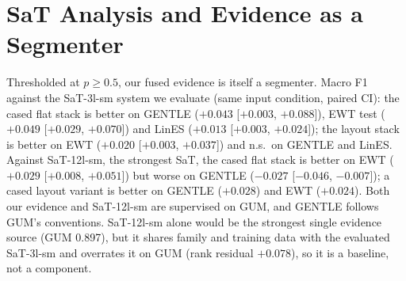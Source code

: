 
\section{SaT Analysis and Evidence as a Segmenter}
\label{app:sat}
Thresholded at $p \ge 0.5$, our fused evidence is itself a segmenter. Macro F1 against the SaT-3l-sm system we evaluate
(same input condition, paired CI): the cased flat stack is better on GENTLE ($+0.043$ [$+0.003$, $+0.088$]), EWT test
($+0.049$ [$+0.029$, $+0.070$]) and LinES ($+0.013$ [$+0.003$, $+0.024$]); the layout stack is better on EWT ($+0.020$
[$+0.003$, $+0.037$]) and n.s.\ on GENTLE and LinES. Against SaT-12l-sm, the strongest SaT, the cased flat stack is better
on EWT ($+0.029$ [$+0.008$, $+0.051$]) but worse on GENTLE ($-0.027$ [$-0.046$, $-0.007$]); a cased layout variant is
better on GENTLE ($+0.028$) and EWT ($+0.024$). Both our evidence and SaT-12l-sm are supervised on GUM, and GENTLE follows
GUM's conventions. SaT-12l-sm alone would be the strongest single evidence source (GUM 0.897), but it shares family and
training data with the evaluated SaT-3l-sm and overrates it on GUM (rank residual $+0.078$), so it is a baseline, not a
component.
